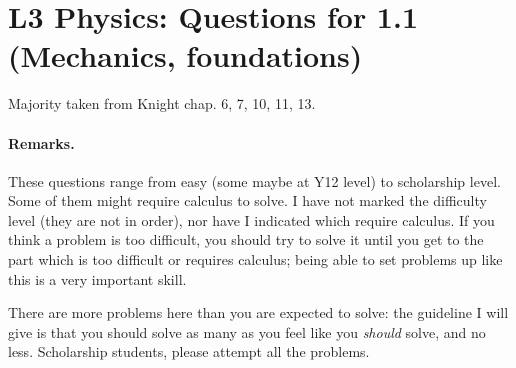 \documentclass[a4paper]{exam}
\begin{document}
  \section*{L3 Physics: Questions for 1.1 (Mechanics, foundations)}
  Majority taken from Knight chap. 6, 7, 10, 11, 13.

  \paragraph{Remarks.} These questions range from easy (some maybe at Y12 level) to scholarship level. Some of them might require calculus to solve.
  I have not marked the difficulty level (they are not in order), nor have I indicated which require calculus. If you think a problem is too difficult,
  you should try to solve it until you get to the part which is too difficult or requires calculus; being able to set problems up like this is a very
  important skill.

  There are more problems here than you are expected to solve: the guideline I will give is that you should solve as many as you feel like you \emph{should}
  solve, and no less. Scholarship students, please attempt all the problems.
\end{document}
